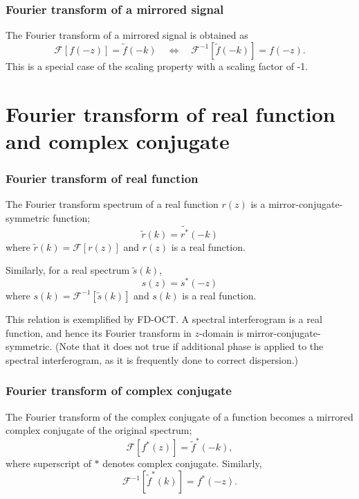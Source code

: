 \documentclass{article}[10pt,a4paper]
\newcommand{\ft}[1]{\mathcal{F}\left[{#1}\right]\xspace}
\newcommand{\ift}[1]{\mathcal{F}^{-1}\left[{#1}\right]\xspace}
\begin{document}
\subsubsection*{Fourier transform of a mirrored signal}
The Fourier transform of a mirrored signal is obtained as
\begin{equation}
 \ft{f(-z)} = \tilde{f}(-k)
  \quad \Leftrightarrow \quad
  \ift{\tilde{f}(-k)} = f(-z).
\end{equation}
This is a special case of the scaling property with a scaling factor of
-1.

\section{Fourier transform of  real function and complex conjugate}
\subsubsection*{Fourier transform of real function}
The Fourier transform spectrum of a real function $r(z)$ is a
mirror-conjugate-symmetric function;
\begin{equation}
 \tilde{r}(k) = \tilde{r^*}(-k)
\end{equation}
where $\tilde{r}(k) = \ft{r(z)}$ and $r(z)$ is a real function.

Similarly, for a real spectrum $\tilde{s}(k)$,
\begin{equation}
 s(z) = s^*(-z)
\end{equation}
where $s(k) = \ift{\tilde{s}(k)}$ and $s(k)$ is a real function.

This relation is exemplified by FD-OCT.
A spectral interferogram is a real function, and hence its Fourier
transform in $z$-domain is mirror-conjugate-symmetric.
(Note that it does not true if additional phase is applied to the
spectral interferogram, as it is frequently done to correct dispersion.)

\subsubsection*{Fourier transform of complex conjugate}
The Fourier transform of the complex conjugate of a function becomes a
mirrored complex conjugate of the original spectrum;
\begin{equation}
 \ft{f^*(z)} = \tilde{f}^*(-k),
\end{equation}
where superscript of $*$ denotes complex conjugate.
Similarly,
\begin{equation}
 \ift{\tilde{f}^*(k)} = f^*(-z).
\end{equation}
\end{document}
